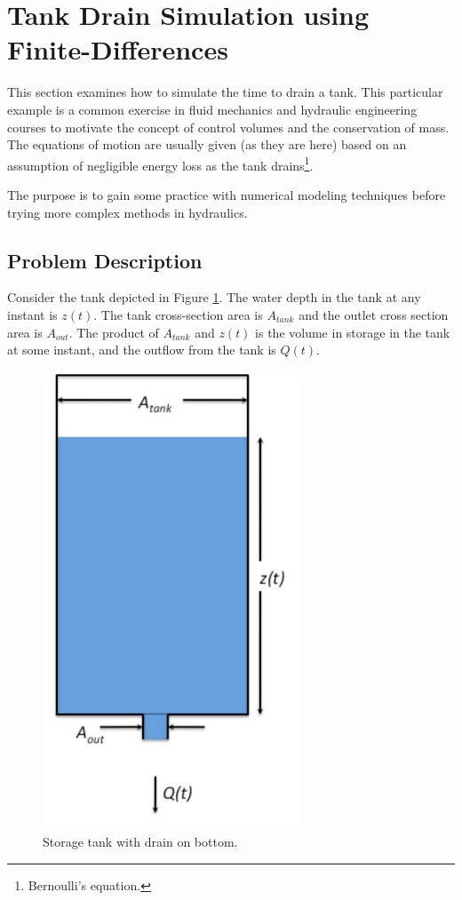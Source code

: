 \section{Tank Drain Simulation using Finite-Differences}
This section examines how to simulate the time to drain a tank.  
This particular example is a common exercise in fluid mechanics and hydraulic engineering courses to motivate the concept of control volumes and the conservation of mass.  
The equations of motion are usually given (as they are here) based on an assumption of negligible energy loss as the tank drains\footnote{Bernoulli's equation.}.

The purpose is to gain some practice with numerical modeling techniques before trying more complex methods in hydraulics.
\subsection{Problem Description}
Consider the tank depicted in Figure \ref{fig:time2drain.pdf}.  The water depth in the tank at any instant is $z(t)$.  The tank cross-section area is $A_{tank}$ and the outlet cross section area is $A_{out}$.   The product of $A_{tank}$ and $z(t)$ is the volume in storage in the tank at some instant, and the outflow from the tank is $Q(t)$.
\begin{figure}[h!] %
   \centering
   \includegraphics[width=3in]{./4-TankDrain/time2drain.pdf} 
   \caption{Storage tank with drain on bottom.}
   \label{fig:time2drain.pdf}
\end{figure}


